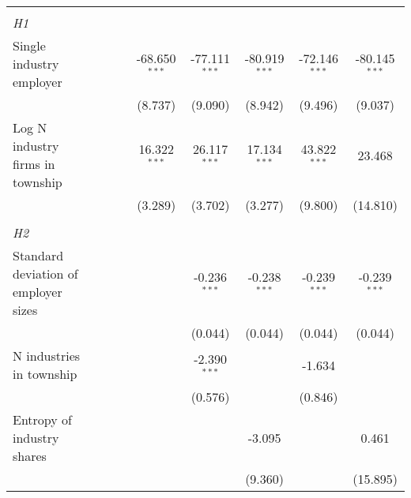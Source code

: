 \begin{tabular}{lcccccccc}
\hdashline %
\\[0.1ex] %
\emph{H1} \\ 
   Single industry employer                              &                &                 &                 & -68.650$^{***}$  & -77.111$^{***}$ & -80.919$^{***}$ & -72.146$^{***}$ & -80.145$^{***}$\\   
                                                         &                &                 &                 & (8.737)          & (9.090)         & (8.942)         & (9.496)         & (9.037)\\   
   Log N industry firms in township                      &                &                 &                 & 16.322$^{***}$   & 26.117$^{***}$  & 17.134$^{***}$  & 43.822$^{***}$  & 23.468\\   
                                                         &                &                 &                 & (3.289)          & (3.702)         & (3.277)         & (9.800)         & (14.810)\\   
\hdashline %
\\[0.1ex] %
\emph{H2} \\ 
   Standard deviation of employer sizes                  &                &                 &                 &                  & -0.236$^{***}$  & -0.238$^{***}$  & -0.239$^{***}$  & -0.239$^{***}$\\   
                                                         &                &                 &                 &                  & (0.044)         & (0.044)         & (0.044)         & (0.044)\\   
   N industries in township                              &                &                 &                 &                  & -2.390$^{***}$  &                 & -1.634          &   \\   
                                                         &                &                 &                 &                  & (0.576)         &                 & (0.846)         &   \\   
   Entropy of industry shares                            &                &                 &                 &                  &                 & -3.095          &                 & 0.461\\   
                                                         &                &                 &                 &                  &                 & (9.360)         &                 & (15.895)\\   

\end{tabular}

